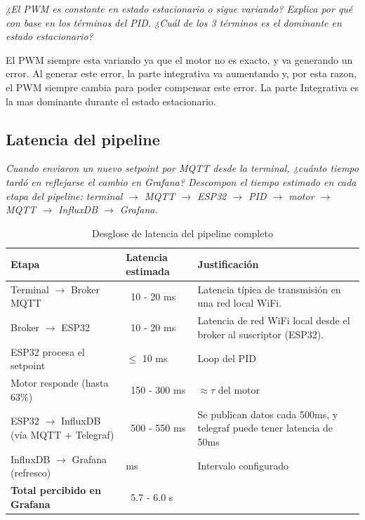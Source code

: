 \documentclass[11pt, letterpaper]{article}
\begin{document}
\textit{¿El PWM es constante en estado estacionario o sigue variando?
Explica por qu\'e con base en los t\'erminos del PID.
¿Cu\'al de los 3 t\'erminos es el dominante en estado estacionario?}

El PWM siempre esta variando ya que el motor no es exacto, y va generando un error. Al generar este error, la parte integrativa va aumentando y, por esta razon, el PWM siempre cambia para poder compensar este error.
La parte Integrativa es la mas dominante durante el estado estacionario.

\subsection{Latencia del pipeline}

\textit{Cuando enviaron un nuevo setpoint por MQTT desde la terminal,
¿cu\'anto tiempo tard\'o en reflejarse el cambio en Grafana?
Descompon el tiempo estimado en cada etapa del pipeline:
terminal $\to$ MQTT $\to$ ESP32 $\to$ PID $\to$ motor $\to$
MQTT $\to$ InfluxDB $\to$ Grafana.}

\begin{table}[H]
  \centering
  \begin{tabular}{p{6cm} >{\centering\arraybackslash}p{3cm} p{4.5cm}}
    \toprule
    \textbf{Etapa} & \textbf{Latencia estimada} & \textbf{Justificaci\'on} \\
    \midrule
    Terminal $\to$ Broker MQTT   & ~10 - 20 ms& Latencia típica de transmisión en una red local WiFi.\\[1em]
    Broker $\to$ ESP32           & ~10 - 20 ms& Latencia de red WiFi local desde el broker al suscriptor (ESP32).\\[1em]
    ESP32 procesa el setpoint    & \cellcolor{grayLight}$\leq$ 10 ms & Loop del PID \\[1em]
    Motor responde (hasta 63\%)  & ~150 - 300 ms& $\approx \tau$ del motor \\[1em]
    ESP32 $\to$ InfluxDB (v\'ia MQTT + Telegraf) & ~500 - 550 ms& Se publican datos cada 500ms, y telegraf puede tener latencia de 50ms\\[1em]
    InfluxDB $\to$ Grafana (refresco) & 5000 ms& Intervalo configurado \\[1em]
    \midrule
    \textbf{Total percibido en Grafana} & ~5.7 - 6.0 s& \\[1em]
    \bottomrule
  \end{tabular}
  \caption{Desglose de latencia del pipeline completo}
\end{table}
\end{document}
